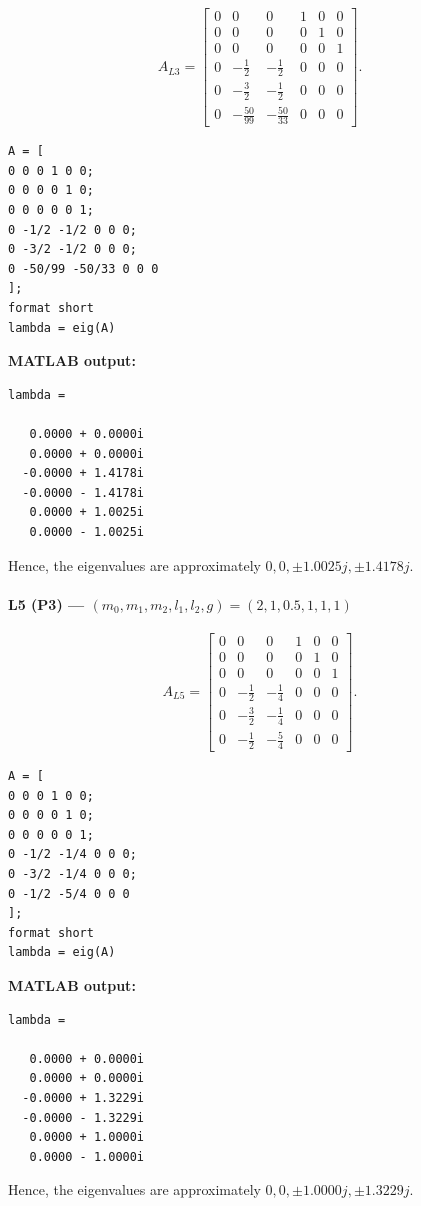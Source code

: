 \documentclass[12pt,a4paper]{article}
\begin{document}
\[
A_{L3}=\begin{bmatrix}
0 & 0 & 0 & 1 & 0 & 0 \\
0 & 0 & 0 & 0 & 1 & 0 \\
0 & 0 & 0 & 0 & 0 & 1 \\
0 & -\frac{1}{2} & -\frac{1}{2} & 0 & 0 & 0 \\
0 & -\frac{3}{2} & -\frac{1}{2} & 0 & 0 & 0 \\
0 & -\frac{50}{99} & -\frac{50}{33} & 0 & 0 & 0
\end{bmatrix}.
\]
\begin{lstlisting}
A = [
0 0 0 1 0 0;
0 0 0 0 1 0;
0 0 0 0 0 1;
0 -1/2 -1/2 0 0 0;
0 -3/2 -1/2 0 0 0;
0 -50/99 -50/33 0 0 0
];
format short
lambda = eig(A)
\end{lstlisting}

\textbf{MATLAB output:}
\begin{lstlisting}[language={}]
lambda =

   0.0000 + 0.0000i
   0.0000 + 0.0000i
  -0.0000 + 1.4178i
  -0.0000 - 1.4178i
   0.0000 + 1.0025i
   0.0000 - 1.0025i
\end{lstlisting}
Hence, the eigenvalues are approximately $0,0,\pm 1.0025j,\pm 1.4178j$.

\vspace{0.3cm}

\Needspace{2cm}
\paragraph*{L5 (P3) --- $(m_0,m_1,m_2,l_1,l_2,g)=(2,1,0.5,1,1,1)$}

\[
A_{L5}=\begin{bmatrix}
0 & 0 & 0 & 1 & 0 & 0 \\
0 & 0 & 0 & 0 & 1 & 0 \\
0 & 0 & 0 & 0 & 0 & 1 \\
0 & -\frac{1}{2} & -\frac{1}{4} & 0 & 0 & 0 \\
0 & -\frac{3}{2} & -\frac{1}{4} & 0 & 0 & 0 \\
0 & -\frac{1}{2} & -\frac{5}{4} & 0 & 0 & 0
\end{bmatrix}.
\]
\begin{lstlisting}
A = [
0 0 0 1 0 0;
0 0 0 0 1 0;
0 0 0 0 0 1;
0 -1/2 -1/4 0 0 0;
0 -3/2 -1/4 0 0 0;
0 -1/2 -5/4 0 0 0
];
format short
lambda = eig(A)
\end{lstlisting}

\textbf{MATLAB output:}
\begin{lstlisting}[language={}]
lambda =

   0.0000 + 0.0000i
   0.0000 + 0.0000i
  -0.0000 + 1.3229i
  -0.0000 - 1.3229i
   0.0000 + 1.0000i
   0.0000 - 1.0000i
\end{lstlisting}
Hence, the eigenvalues are approximately $0,0,\pm 1.0000j,\pm 1.3229j$.
\end{document}
